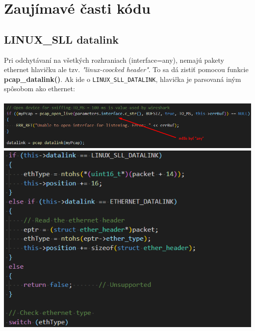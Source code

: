 \documentclass{article}
\begin{document}
        \newpage

    \section{Zaujímavé časti kódu}
        \subsection{LINUX\_SLL datalink}
        Pri odchytávaní na všetkých rozhraniach (interface=any), nemajú pakety ethernet hlavičku ale tzv. \emph{"linux-coocked header"}.
        To sa dá zistiť pomocou funkcie \textbf{pcap\_datalink()}. Ak ide o \texttt{LINUX\_SLL\_DATALINK}, hlavička je parsovaná iným spôsobom ako ethernet:\\\\
        \includegraphics[scale=0.6]{datalink.png}\\
        \includegraphics[scale=0.6]{ethernet.png}
\end{document}
